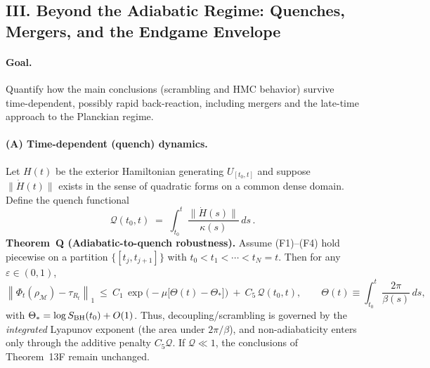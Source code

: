 \bigskip
\subsection*{III. Beyond the Adiabatic Regime: Quenches, Mergers, and the Endgame Envelope}
\paragraph{Goal.}
Quantify how the main conclusions (scrambling and HMC behavior) survive time-dependent, possibly rapid back-reaction, including mergers and the late-time approach to the Planckian regime.

\paragraph{(A) Time-dependent (quench) dynamics.}
Let $H(t)$ be the exterior Hamiltonian generating $U_{[t_0,t]}$ and suppose $\|\dot H(t)\|$ exists in the sense of quadratic forms on a common dense domain. Define the quench functional
\[
  \mathcal{Q}(t_0,t)\;=\;\int_{t_0}^t \frac{\|\dot H(s)\|}{\kappa(s)}\,ds\,.
\]
\textbf{Theorem~Q (Adiabatic-to-quench robustness).} Assume (F1)--(F4) hold piecewise on a partition $\{[t_j,t_{j+1}]\}$ with $t_0<t_1<\cdots<t_N=t$. Then for any $\varepsilon\in(0,1)$,
\begin{equation}
  \left\| \Phi_t(\rho_{\mathcal{M}})-\tau_{R_t}\right\|_1
  \ \le\ C_1\, \exp\!\Big(-\mu\big[\Theta(t)-\Theta_*\big]\Big)\ +\ C_5\,\mathcal{Q}(t_0,t),
  \qquad
  \Theta(t)\equiv \int_{t_0}^{t} \frac{2\pi}{\beta(s)}\,ds,
  \label{eq:quench-bound}
\end{equation}
with $\Theta_*=\log S_{\rm BH}(t_0)+O(1)$.
Thus, decoupling/scrambling is governed by the \emph{integrated} Lyapunov exponent (the area under $2\pi/\beta$), and non-adiabaticity enters only through the additive penalty $C_5\mathcal{Q}$. If $\mathcal{Q}\ll1$, the conclusions of Theorem~13F remain unchanged.

